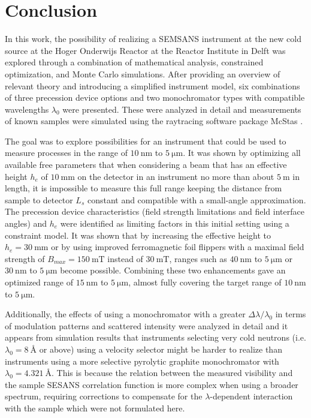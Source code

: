 \chapter{Conclusion}
\label{chapter:conclusion}
\label{c7:conclusion}
In this work, the possibility of realizing a SEMSANS instrument at the new cold source at the Hoger Onderwijs Reactor at the Reactor Institute in Delft was explored through a combination of mathematical analysis, constrained optimization, and Monte Carlo simulations. After providing an overview of relevant theory and introducing a simplified instrument model, six combinations of three precession device options and two monochromator types with compatible wavelengths $\lambda_0$ were presented. These were analyzed in detail and measurements of known samples were simulated using the raytracing software package McStas \cite{willendrup2020}. 

The goal was to explore possibilities for an instrument that could be used to measure processes in the range of $\SI{10}{\nano\meter}$ to $\SI{5}{\micro\meter}$. It was shown by optimizing all available free parameters that when considering a beam that has an effective height $h_e$ of $\SI{10}{\milli\meter}$ on the detector in an instrument no more than about $\SI{5}{\meter}$ in length, it is impossible to measure this full range keeping the distance from sample to detector $L_s$ constant and compatible with a small-angle approximation. The precession device characteristics (field strength limitations and field interface angles) and  $h_e$ were identified as limiting factors in this initial setting using a constraint model. It was shown that by increasing the effective height to $h_e = \SI{30}{\milli\meter}$ or by using improved ferromagnetic foil flippers with a maximal field strength of $B_{max} = \SI{150}{\milli\tesla}$ instead of $\SI{30}{\milli\tesla}$, ranges such as $\SI{40}{\nano\meter}$ to $\SI{5}{\micro\meter}$ or $\SI{30}{\nano\meter}$ to $\SI{5}{\micro\meter}$ become possible. Combining these two enhancements gave an optimized range of $\SI{15}{\nano\meter}$ to $\SI{5}{\micro\meter}$, almost fully covering the target range of $\SI{10}{\nano\meter}$ to $\SI{5}{\micro\meter}$.

Additionally, the effects of using a monochromator with a greater $\Delta\lambda/\lambda_0$ in terms of modulation patterns and scattered intensity were analyzed in detail and it appears from simulation results that instruments selecting very cold neutrons (i.e. $\lambda_0 = \SI{8}{\angstrom}$ or above) using a velocity selector might be harder to realize than instruments using a more selective pyrolytic graphite monochromator with $\lambda_0 = \SI{4.321}{\angstrom}$. This is because the relation between the measured visibility and the sample SESANS correlation function is more complex when using a broader spectrum, requiring corrections to compensate for the $\lambda$-dependent interaction with the sample which were not formulated here.

